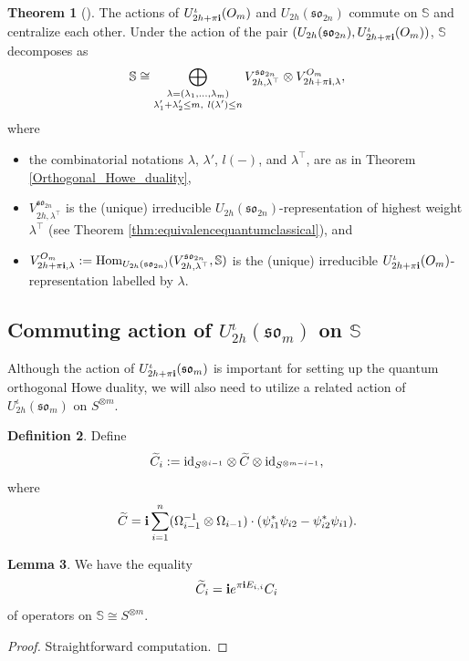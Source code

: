 \documentclass[10pt]{amsart}
\numberwithin{equation}{section}
\theoremstyle{definition}
\newtheorem{theorem}{Theorem}[section]
\newtheorem{lemma}[theorem]{Lemma}
\newtheorem{definition}[theorem]{Definition}
\newcommand{\Hom}{{\rm Hom}}
\newcommand{\id}{{\rm id}}
\newcommand{\son}[1][2n]{\mathfrak{so}_{#1}}
\newcommand{\som}[1][m]{\mathfrak{so}_{#1}}
\newcommand{\ot}{\otimes}
\newcommand{\howespin}{\boldsymbol{\mathbb{S}}}
\begin{document}
\begin{theorem}[{\cite[Theorem 5.3(b)]{Wenzl-Spin}}]\label{thm:quantumorthogonalHowe}
      The actions of $U_{2h+\pi {\bf i}}^{\iota}(O_m)$ and $U_{2h}(\son)$ commute on $\howespin$ and centralize each other. Under the action of the pair $(U_{2h}(\son), U^{\iota}_{2h+\pi {\bf i}}(O_m))$, $\howespin$ decomposes as
      \begin{equation}
          \howespin\cong \bigoplus_{\substack{\lambda=(\lambda_1,\dots, \lambda_m) \\ \lambda^{\prime}_1+\lambda^{\prime}_2\le m, \ l(\lambda^{\prime})\le n}} V^{\son}_{2h,\lambda^{\top}}\ot V^{O_m}_{2h+\pi{\bf i},\lambda}, 
      \end{equation}
      where
\begin{itemize}
    \item the combinatorial notations $\lambda$, $\lambda'$, $l(-)$, and $\lambda^{\top}$, are as in Theorem \ref{Orthogonal_Howe_duality},
    \item $V^{\son}_{2h,\lambda^{\top}}$ is the (unique) irreducible $U_{2h}(\son)$-representation of highest weight $\lambda^\top$ (see Theorem \ref{thm:equivalencequantumclassical}), and
    \item $V^{O_m}_{2h+\pi{\bf i},\lambda}:= \Hom_{U_{2h}(\son)}(V^{\son}_{2h,\lambda^{\top}}, \howespin) $ is the (unique) irreducible $U^{\iota}_{2h+\pi{\bf i}}(O_m)$-representation labelled by $\lambda$.
\end{itemize}
\end{theorem}

\subsection{Commuting action of $U_{2h}^{\iota}(\som)$ on $\howespin$}
Although the action of $U^{\iota}_{2h+\pi {\bf i}}(\mathfrak{so}_m)$ is important for setting up the quantum orthogonal Howe duality, we will also need to utilize a related action of $U^{\iota}_{2h}(\mathfrak{so}_m)$ on $S^{\otimes m}$.
\begin{definition}
Define
\[
\widetilde{C}_i:= \id_{S^{\ot i-1}}\ot \widetilde{C} \ot \id_{S^{\ot m-i-1}},
\]
where
\begin{equation}\label{tilde_c}
    \widetilde{C}={\bf i}\sum_{i=1}^n (\Omega_{i-1}^{-1}\ot \Omega_{i-1})\cdot (\psi_{i1}^*\psi_{i2}-\psi_{i2}^* \psi_{i1}).
\end{equation}
\end{definition}
\begin{lemma}\label{lem:tildeCisC}
We have the equality
\[
\widetilde{C}_i= {\bf i} e^{\pi {\bf i} E_{i,i}} C_i
\]
of operators on $\howespin\cong S^{\otimes m}$.
\end{lemma}
\begin{proof}
    Straightforward computation.
\end{proof}
\end{document}
